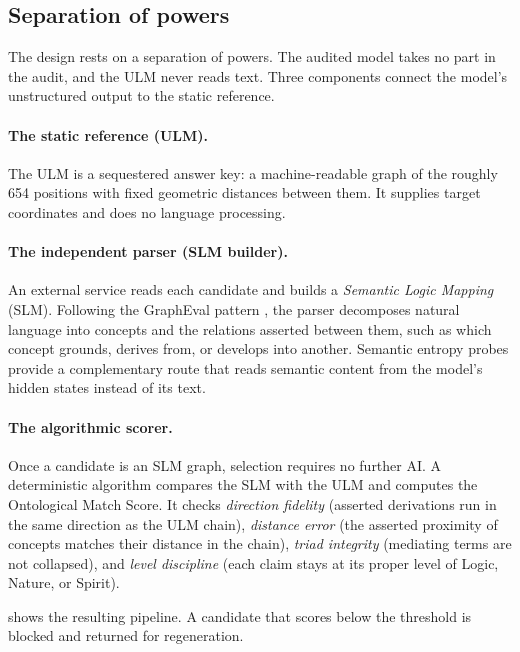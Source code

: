 \documentclass[twocolumn]{ulpaper}
\begin{document}
\subsection{Separation of powers}

The design rests on a separation of powers. The audited model takes no part in the audit, and the ULM never reads text. Three components connect the model's unstructured output to the static reference.

\paragraph{The static reference (ULM).} The ULM is a sequestered answer key: a machine-readable graph of the roughly 654 positions with fixed geometric distances between them. It supplies target coordinates and does no language processing.

\paragraph{The independent parser (SLM builder).} An external service reads each candidate and builds a \emph{Semantic Logic Mapping} (SLM). Following the GraphEval pattern \citep{sansford2024grapheval}, the parser decomposes natural language into concepts and the relations asserted between them, such as which concept grounds, derives from, or develops into another. Semantic entropy probes \citep{kossen2024semantic} provide a complementary route that reads semantic content from the model's hidden states instead of its text.

\paragraph{The algorithmic scorer.} Once a candidate is an SLM graph, selection requires no further AI. A deterministic algorithm compares the SLM with the ULM and computes the Ontological Match Score. It checks \emph{direction fidelity} (asserted derivations run in the same direction as the ULM chain), \emph{distance error} (the asserted proximity of concepts matches their distance in the chain), \emph{triad integrity} (mediating terms are not collapsed), and \emph{level discipline} (each claim stays at its proper level of Logic, Nature, or Spirit).

 shows the resulting pipeline. A candidate that scores below the threshold is blocked and returned for regeneration.
\end{document}
